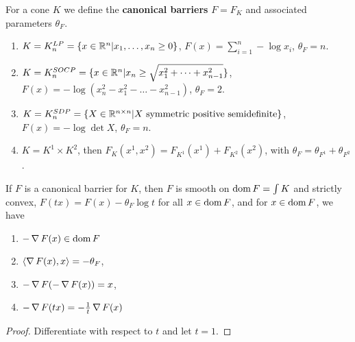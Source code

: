 \begin{defn}
  \label{sec:inter-point-meth-1}
  For a cone $K$ we define the \textbf{canonical barriers} $F = F_{K}$
  and associated parameters $\theta_{F}$.
  \begin{enumerate}
  \item $K = K^{LP}_{n} = \{ x \in \mathbb{R}^{n} | x_{1}, \dots, x_{n} \geq 0
    \} $, $F(x) = \sum_{i=1}^{n} -\log x_{i}$, $\theta_{F} = n$.
  \item $K = K_{n}^{SOCP} = \{ x \in \mathbb{R}^{n} | x_{n} \geq
    \sqrt{x_{1}^{2} + \cdots + x_{n-1}^{2}}\}$, $F(x) =
    -\log(x_{n}^{2} - x_{1}^{2} - \dots - x_{n-1}^{2})$, $\theta_{F} =
    2$.
  \item $K = K_{n}^{SDP} = \{ X \in \mathbb{R}^{n \times n} | \text{$X$
      symmetric positive semidefinite} \}$, $F(x) = - \log \det X$,
    $\theta_{F} = n$.
  \item $K = K^{1} \times K^{2}$, then $F_{K}(x^{1}, x^{2}) =
    F_{K^{1}}(x^{1}) + F_{K^{2}}(x^{2})$, with $\theta_{F} =
    \theta_{F^{1}} + \theta_{F^{2}}$.
  \end{enumerate}
\end{defn}

\begin{thm}
  \label{sec:inter-point-meth-2}
  If $F$ is a canonical barrier for $K$, then $F$ is smooth on $\operatorname*{dom} F
  = \int K$ and strictly convex, $F(tx) = F(x) - \theta_{F} \log t$
  for all  $x \in \operatorname*{dom} F$, and for $x \in \operatorname*{dom} F$, we have
  \begin{enumerate}
  \item $- \operatorname{\nabla} F(x) \in \operatorname*{dom} F$
  \item $\IP{\grad F(x), x} = - \theta_{F}$,
  \item $-\operatorname{\nabla} F(-\operatorname{\nabla} F(x)) = x$,
  \item $-\operatorname{\nabla} F(tx) = -\frac{1}{t} \operatorname{\nabla} F(x)$
  \end{enumerate}
\end{thm}

\begin{proof}
  Differentiate with respect to $t$ and let $t = 1$.
\end{proof}

